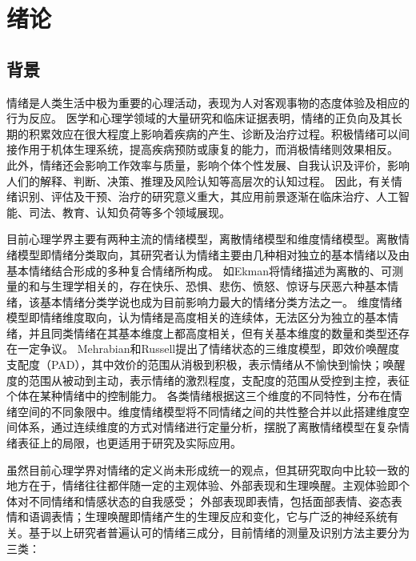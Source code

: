 \cleardoublepage

\setcounter{page}{1}
\section{绪论}

\subsection{背景}

情绪是人类生活中极为重要的心理活动，表现为人对客观事物的态度体验及相应的行为反应\cite{Mengzhaolan2005}。
医学和心理学领域的大量研究和临床证据表明\cite{Moskowitz2008,Dongyan2012,Ong2006,Caprara2020,Trivedi2020,Trivedi2020}，情绪的正负向及其长期的积累效应在很大程度上影响着疾病的产生、诊断及治疗过程。积极情绪可以间接作用于机体生理系统，提高疾病预防或康复的能力，而消极情绪则效果相反。
此外，情绪还会影响工作效率与质量，影响个体个性发展、自我认识及评价，影响人们的解释、判断、决策、推理及风险认知等高层次的认知过程。
因此，有关情绪识别、评估及干预、治疗的研究意义重大，其应用前景逐渐在临床治疗、人工智能、司法、教育、认知负荷等多个领域展现。

目前心理学界主要有两种主流的情绪模型，离散情绪模型和维度情绪模型。离散情绪模型即情绪分类取向，其研究者认为情绪主要由几种相对独立的基本情绪以及由基本情绪结合形成的多种复合情绪所构成\cite{Mengzhaolan2005}。
如Ekman将情绪描述为离散的、可测量的和与生理学相关的，存在快乐、恐惧、悲伤、愤怒、惊讶与厌恶六种基本情绪\cite{Ekman1971,Ekman1992}，该基本情绪分类学说也成为目前影响力最大的情绪分类方法之一。
维度情绪模型即情绪维度取向，认为情绪是高度相关的连续体，无法区分为独立的基本情绪，并且同类情绪在其基本维度上都高度相关，但有关基本维度的数量和类型还存在一定争议\cite{Mengzhaolan2005}。
Mehrabian和Russell提出了情绪状态的三维度模型，即效价唤醒度支配度（PAD）\cite{Mehrabian1974}，其中效价的范围从消极到积极，表示情绪从不愉快到愉快；唤醒度的范围从被动到主动，表示情绪的激烈程度，支配度的范围从受控到主控，表征个体在某种情绪中的控制能力。
各类情绪根据这三个维度的不同特性，分布在情绪空间的不同象限中。维度情绪模型将不同情绪之间的共性整合并以此搭建维度空间体系，通过连续维度的方式对情绪进行定量分析，摆脱了离散情绪模型在复杂情绪表征上的局限，也更适用于研究及实际应用。

虽然目前心理学界对情绪的定义尚未形成统一的观点，但其研究取向中比较一致的地方在于，情绪往往都伴随一定的主观体验、外部表现和生理唤醒\cite{Mengzhaolan2005}。主观体验即个体对不同情绪和情感状态的自我感受；
外部表现即表情，包括面部表情、姿态表情和语调表情；生理唤醒即情绪产生的生理反应和变化，它与广泛的神经系统有关\cite{Mengzhaolan2005}。基于以上研究者普遍认可的情绪三成分，目前情绪的测量及识别方法主要分为三类：

